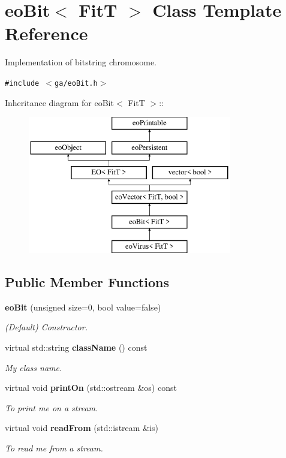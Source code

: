 \section{eo\-Bit$<$ Fit\-T $>$ Class Template Reference}
\label{classeo_bit}
Implementation of bitstring chromosome.  


{\tt \#include $<$ga/eo\-Bit.h$>$}

Inheritance diagram for eo\-Bit$<$ Fit\-T $>$::\begin{figure}[H]
\begin{center}
\leavevmode
\includegraphics[height=6cm]{classeo_bit}
\end{center}
\end{figure}
\subsection*{Public Member Functions}
\begin{CompactItemize}
\item 
{\bf eo\-Bit} (unsigned size=0, bool value=false)
\begin{CompactList}\small\item\em (Default) Constructor. \item\end{CompactList}\item 
virtual std::string {\bf class\-Name} () const \label{classeo_bit_a1}

\begin{CompactList}\small\item\em My class name. \item\end{CompactList}\item 
virtual void {\bf print\-On} (std::ostream \&os) const 
\begin{CompactList}\small\item\em To print me on a stream. \item\end{CompactList}\item 
virtual void {\bf read\-From} (std::istream \&is)
\begin{CompactList}\small\item\em To read me from a stream. \item\end{CompactList}\end{CompactItemize}


